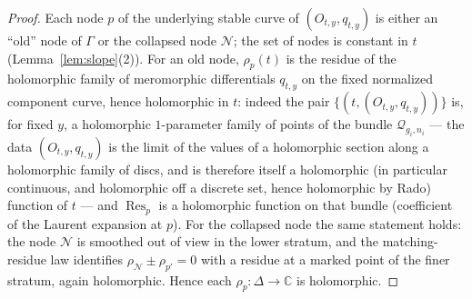\documentclass[11pt]{article}
\newcommand{\C}{\mathbb{C}}
\newcommand{\cQ}{\mathcal{Q}}
\DeclareMathOperator{\Res}{Res}
\theoremstyle{definition}
\theoremstyle{remark}
\begin{document}
\begin{proof}
Each node $p$ of the underlying stable curve of $(O_{t,y},q_{t,y})$ is
either an ``old'' node of $\Gamma$ or the collapsed node $\mathcal N$;
the set of nodes is constant in $t$ (Lemma~\ref{lem:slope}(2)). For an
old node, $\rho_p(t)$ is the residue of the holomorphic family of
meromorphic differentials $q_{t,y}$ on the fixed normalized component
curve, hence holomorphic in $t$: indeed the pair
$\{(t, (O_{t,y},q_{t,y}))\}$ is, for fixed $y$, a holomorphic
$1$-parameter family of points of the bundle $\cQ_{g_i,n_i}$ --- the
data $(O_{t,y},q_{t,y})$ is the limit of the values of a holomorphic
section along a holomorphic family of discs, and is therefore itself a
holomorphic (in particular continuous, and holomorphic off a discrete
set, hence holomorphic by Rado) function of $t$ --- and
$\Res_p$ is a holomorphic function on that bundle
(coefficient of the Laurent expansion at $p$). For the collapsed node
the same statement holds: the node $\mathcal N$ is smoothed out of view
in the lower stratum, and the matching-residue law identifies
$\rho_{\mathcal N} \pm \rho_{p'} = 0$ with a residue at a marked point
of the finer stratum, again holomorphic. Hence each
$\rho_p : \Delta \to \C$ is holomorphic.


\end{proof}
\end{document}
